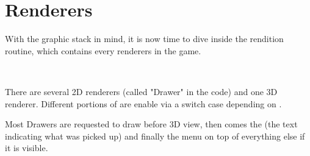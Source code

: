 \section{Renderers}
With the graphic stack in mind, it is now time to dive inside the rendition routine,  which contains every renderers in the game.\\
\par
{}\\
\par
 There are several 2D renderers (called "Drawer" in the code) and one 3D renderer. Different portions of  are enable via a switch case depending on .\\
 \par
  Most Drawers are requested to draw before 3D view, then comes the  (the text indicating what was picked up) and finally the menu on top of everything else if it is visible.

